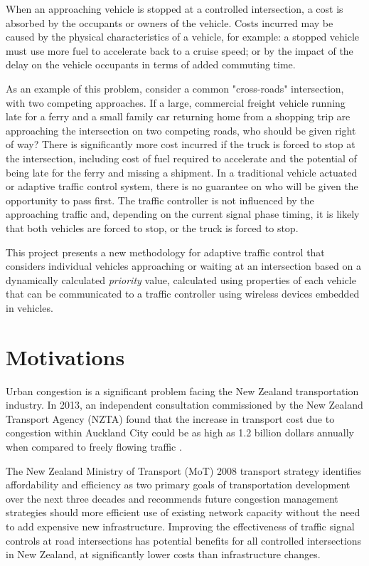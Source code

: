 When an approaching vehicle is stopped at a controlled intersection, a cost is absorbed by the occupants or owners of the vehicle. Costs incurred may be caused by the physical characteristics of a vehicle, for example: a stopped vehicle must use more fuel to accelerate back to a cruise speed; or by the impact of the delay on the vehicle occupants in terms of added commuting time.

As an example of this problem, consider a common "cross-roads" intersection, with two competing approaches. If a large, commercial freight vehicle running late for a ferry and a small family car returning home from a shopping trip are approaching the intersection on two competing roads, who should be given right of way? There is significantly more cost incurred if the truck is forced to stop at the intersection, including cost of fuel required to accelerate and the potential of being late for the ferry and missing a shipment. In a traditional vehicle actuated or adaptive traffic control system, there is no guarantee on who will be given the opportunity to pass first. The traffic controller is not influenced by the approaching traffic and, depending on the current signal phase timing, it is likely that both vehicles are forced to stop, or the truck is forced to stop. 

This project presents a new methodology for adaptive traffic control that considers individual vehicles approaching or waiting at an intersection based on a dynamically calculated \emph{priority} value, calculated using properties of each vehicle that can be communicated to a traffic controller using wireless devices embedded in vehicles.

\section {Motivations}

Urban congestion is a significant problem facing the New Zealand transportation industry. In 2013, an independent consultation commissioned by the New Zealand Transport Agency (NZTA) found that the increase in transport cost due to congestion within Auckland City could be as high as 1.2 billion dollars annually when compared to freely flowing traffic \cite{wallis2013costs}. 

The New Zealand Ministry of Transport (MoT) 2008 transport strategy identifies affordability and efficiency as two primary goals of transportation development over the next three decades and recommends future congestion management strategies should more efficient use of existing network capacity without the need to add expensive new infrastructure. Improving the effectiveness of traffic signal controls at road intersections has potential benefits for all controlled intersections in New Zealand, at significantly lower costs than infrastructure changes.

